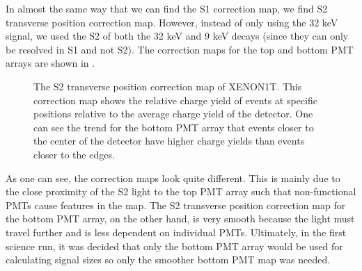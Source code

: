 In almost the same way that we can find the S1 correction map, we find S2 transverse position correction map.  However, instead of only using the 32 keV signal, we used the S2 of both the 32 keV and 9 keV decays (since they can only be resolved in S1 and not S2).  The correction maps for the top and bottom PMT arrays are shown in .


\begin{figure}[t]
	\centering
	 \hfill
	\caption{The S2 transverse position correction map of XENON1T.  This correction map shows the relative charge yield of events at specific positions relative to the average charge yield of the detector.  One can see the trend for the bottom PMT array that events closer to the center of the detector have higher charge yields than events closer to the edges.}
	\label{fig:xe1t_s2_correction_map_xy}
\end{figure}

As one can see, the correction maps look quite different.  This is mainly due to the close proximity of the S2 light to the top PMT array such that non-functional PMTs cause features in the map.  The S2 transverse position correction map for the bottom PMT array, on the other hand, is very smooth because the light must travel further and is less dependent on individual PMTs.  Ultimately, in the first science run, it was decided that only the bottom PMT array would be used for calculating signal sizes so only the smoother bottom PMT map was needed.

